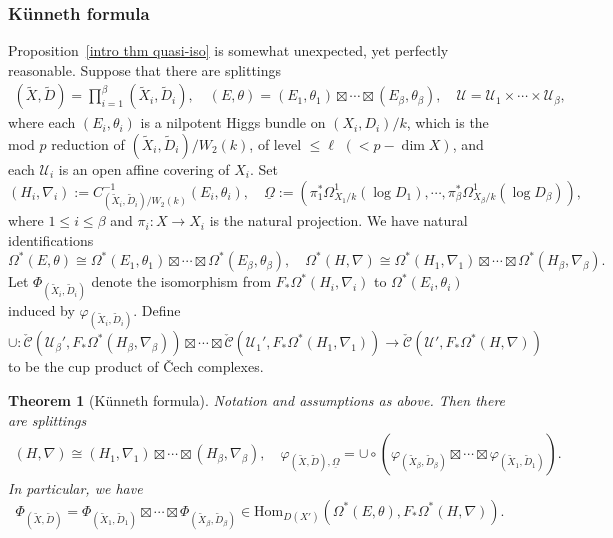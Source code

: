 \documentclass[12pt, a4paper]{article}
\newtheorem{theorem}{Theorem}[section]
\begin{document}
\subsubsection{K\"unneth formula}
 Proposition~\ref{intro thm quasi-iso} is somewhat unexpected, yet perfectly reasonable. Suppose that there are splittings
\begin{eqnarray}\label{intro assumption splitting}
(\tilde{X}, \tilde{D}) = \prod_{i=1}^\beta (\tilde{X}_i, \tilde{D}_i), \quad (E, \theta) = (E_1, \theta_1)\boxtimes\cdots\boxtimes(E_\beta,\theta_\beta),\quad
\mathcal{U} = \mathcal{U}_1 \times \cdots \times \mathcal{U}_\beta,
\end{eqnarray}
where each \((E_i, \theta_i)\) is a nilpotent Higgs bundle on \((X_i, D_i)/k\), which is the mod \(p\) reduction of \((\tilde{X}_i, \tilde{D}_i)/W_2(k)\), of level \(\leq\ell\) $(<p-\dim X)$, and each \(\mathcal{U}_i\) is an open affine covering of \(X_i\). Set $$(H_i,\nabla_i):=C^{-1}_{(\tilde X_i,\tilde D_i)/W_2(k)}(E_i,\theta_i),\quad \underline\Omega:=(\pi_1^*\Omega^1_{X_1/k}(\log D_1),\cdots,\pi_\beta^*\Omega^1_{X_\beta/k}(\log D_\beta)),$$
where $1\leq i\leq\beta$ and $\pi_i:X\to X_i$ is the natural projection. We have natural identifications 
$$
\Omega^*(E,\theta)\cong\Omega^*(E_1,\theta_1)\boxtimes\cdots\boxtimes\Omega^*(E_\beta,\theta_\beta),\quad \Omega^*(H,\nabla)\cong\Omega^*(H_1,\nabla_1)\boxtimes\cdots\boxtimes\Omega^*(H_\beta,\nabla_\beta).$$
Let $\Phi_{(\tilde X_i,\tilde D_i)}$ denote the isomorphism from $F_*\Omega^*(H_i,\nabla_i)$ to $\Omega^*(E_i,\theta_i)$ induced by $\varphi_{(\tilde X_i,\tilde D_i)}$.
Define 
$$
\cup:\check{\mathcal C}(\mathcal U_\beta',F_*\Omega^*(H_\beta,\nabla_\beta))\boxtimes\cdots\boxtimes\check{\mathcal C}(\mathcal U_1',F_*\Omega^*(H_1,\nabla_1))\to\check{\mathcal C}(\mathcal U',F_*\Omega^*(H,\nabla))$$
to be the cup product of \v{C}ech complexes. 
\begin{theorem}[K\"unneth formula]
Notation and assumptions as above. Then there are splittings
\begin{eqnarray}\label{intro splitting}
(H,\nabla)\cong(H_1,\nabla_1)\boxtimes\cdots\boxtimes(H_\beta,\nabla_\beta),\quad \varphi_{(\tilde X,\tilde D),\underline\Omega}=\cup\circ(\varphi_{(\tilde X_\beta,\tilde D_\beta)}\boxtimes\cdots\boxtimes\varphi_{(\tilde X_1,\tilde D_1)}).
\end{eqnarray}
In particular, we have
$$
\Phi_{(\tilde X,\tilde D)}=\Phi_{(\tilde X_1,\tilde D_1)}\boxtimes\cdots\boxtimes\Phi_{(\tilde X_\beta,\tilde D_\beta)}\in\mathrm{Hom}_{D(X')}(\Omega^*(E,\theta),F_*\Omega^*(H,\nabla)).
$$
\end{theorem}
\end{document}
